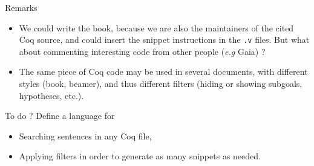 \documentclass[10pt]{beamer}
\newcommand{\coq}{Coq\xspace}
\newcommand{\gaia}{Gaia\xspace}
\begin{document}
\begin{frame}
    
  \begin{block}{Remarks}
    \begin{itemize}
    \item We could write the book, because we are also the maintainers of the cited \coq source, and could insert the snippet instructions in the \texttt{.v} files. \textcolor{lookcolor}{But what about commenting interesting code from other people (\emph{e.g}
        \gaia) ?}
    \item The same  piece of \coq code may be used in several documents, with different styles (book, beamer), and thus
      different filters (hiding or showing subgoals, hypotheses, etc.).
      
    \end{itemize}
  \end{block}

  \begin{block}{To do ?}
    Define a language for
    \begin{itemize}
    \item Searching sentences in any \coq file,
    \item Applying filters in order to generate as many snippets as needed.
    \end{itemize}
  \end{block}
\end{frame}
\end{document}
